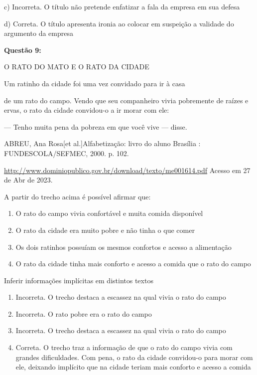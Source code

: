 c) Incorreta. O título não pretende enfatizar a fala da empresa em sua
defesa

d) Correta. O título apresenta ironia ao colocar em suspeição a validade
do argumento da empresa

\textbf{Questão 9:}

O RATO DO MATO E O RATO DA CIDADE

Um ratinho da cidade foi uma vez convidado para ir à casa

de um rato do campo. Vendo que seu companheiro vivia pobremente de
raízes e ervas, o rato da cidade convidou-o a ir morar com ele:

--- Tenho muita pena da pobreza em que você vive --- disse.

ABREU, Ana Rosa{[}et al.{]}Alfabetização: livro do aluno Brasília :
FUNDESCOLA/SEFMEC, 2000. p. 102.

\href{http://www.dominiopublico.gov.br/download/texto/me001614.pdf}{{http://www.dominiopublico.gov.br/download/texto/me001614.pdf}}
Acesso em 27 de Abr de 2023.

A partir do trecho acima é possível afirmar que:

\begin{enumerate}
\def\labelenumi{\alph{enumi})}
\item
  O rato do campo vivia confortável e muita comida disponível
\item
  O rato da cidade era muito pobre e não tinha o que comer
\item
  Os dois ratinhos possuíam os mesmos confortos e acesso a alimentação
\item
  O rato da cidade tinha mais conforto e acesso a comida que o rato do
  campo
\end{enumerate}

Inferir informações implícitas em distintos textos

\begin{enumerate}
\def\labelenumi{\alph{enumi})}
\item
  Incorreta. O trecho destaca a escassez na qual vivia o rato do campo
\item
  Incorreta. O rato pobre era o rato do campo
\item
  Incorreta. O trecho destaca a escassez na qual vivia o rato do campo
\item
  Correta. O trecho traz a informação de que o rato do campo vivia com
  grandes dificuldades. Com pena, o rato da cidade convidou-o para morar
  com ele, deixando implícito que na cidade teriam mais conforto e
  acesso a comida
\end{enumerate}

